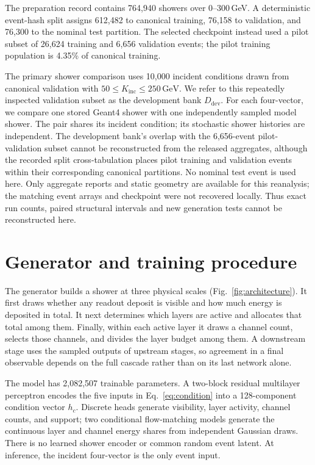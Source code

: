\documentclass[11pt]{article}
\newcommand{\GeV}{\,\mathrm{GeV}}
\newcommand{\Kinc}{K_{\mathrm{inc}}}
\newcommand{\Ddev}{D_{\mathrm{dev}}}
\begin{document}
The preparation record contains 764,940 showers over 0--300\,GeV. A deterministic event-hash split assigns 612,482 to canonical training, 76,158 to validation, and 76,300 to the nominal test partition. The selected checkpoint instead used a pilot subset of 26,624 training and 6,656 validation events; the pilot training population is 4.35\% of canonical training.

The primary shower comparison uses 10,000 incident conditions drawn from canonical validation with $50\leq\Kinc\leq250\GeV$. We refer to this repeatedly inspected validation subset as the development bank $\Ddev$. For each four-vector, we compare one stored Geant4 shower with one independently sampled model shower. The pair shares its incident condition; its stochastic shower histories are independent. The development bank's overlap with the 6,656-event pilot-validation subset cannot be reconstructed from the released aggregates, although the recorded split cross-tabulation places pilot training and validation events within their corresponding canonical partitions. No nominal test event is used here. Only aggregate reports and static geometry are available for this reanalysis; the matching event arrays and checkpoint were not recovered locally. Thus exact run counts, paired structural intervals and new generation tests cannot be reconstructed here.

\section{Generator and training procedure}
\label{sec:model}

The generator builds a shower at three physical scales (Fig.~\ref{fig:architecture}). It first draws whether any readout deposit is visible and how much energy is deposited in total. It next determines which layers are active and allocates that total among them. Finally, within each active layer it draws a channel count, selects those channels, and divides the layer budget among them. A downstream stage uses the sampled outputs of upstream stages, so agreement in a final observable depends on the full cascade rather than on its last network alone.

The model has 2,082,507 trainable parameters. A two-block residual multilayer perceptron encodes the five inputs in Eq.~\eqref{eq:condition} into a 128-component condition vector $h_c$. Discrete heads generate visibility, layer activity, channel counts, and support; two conditional flow-matching models generate the continuous layer and channel energy shares from independent Gaussian draws. There is no learned shower encoder or common random event latent. At inference, the incident four-vector is the only event input.
\end{document}
